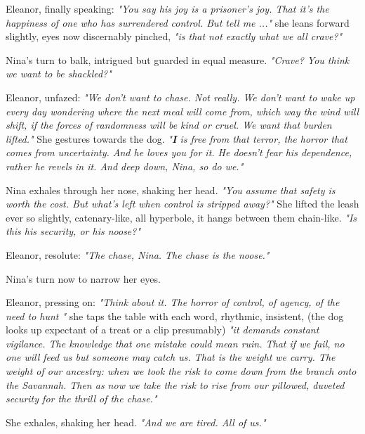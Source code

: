\smallskip

Eleanor, finally speaking: \textit{"You say his joy is a prisoner’s joy. That it’s the happiness of one who has surrendered control. But tell me ..."} she leans forward slightly, eyes now discernably pinched, \textit{"is that not exactly what we all crave?"}

\smallskip

Nina's turn to balk, intrigued but guarded in equal measure. \textit{"Crave? You think we want to be shackled?"}

\smallskip

Eleanor, unfazed: \textit{"We don’t want to chase. Not really. We don’t want to wake up every day wondering where the next meal will come from, which way the wind will shift, if the forces of randomness will be kind or cruel. We want that burden lifted."} She gestures towards the dog. \textit{"\textbf{I} is free from that terror, the horror that comes from uncertainty. And he loves you for it. He doesn’t fear his dependence, rather he revels in it. And deep down, Nina, so do we."}

\smallskip

Nina exhales through her nose, shaking her head. \textit{"You assume that safety is worth the cost. But what’s left when control is stripped away?"} She lifted the leash ever so slightly, catenary-like, all hyperbole, it hangs between them chain-like. \textit{"Is this his security, or his noose?"}

\smallskip

Eleanor, resolute: \textit{"The chase, Nina. The chase is the noose."}

\smallskip

Nina's turn now to narrow her eyes.  

\smallskip

Eleanor, pressing on: \textit{"Think about it. The horror of control, of agency, of the need to hunt "} she taps the table with each word, rhythmic, insistent, (the dog looks up expectant of a treat or a clip presumably) \textit{"it demands \textit{constant vigilance}. The knowledge that one mistake could mean ruin. That if we fail, no one will feed us but someone may catch us. That is the weight we carry. The weight of our ancestry: when we took the risk to come down from the branch onto the Savannah. Then as now we take the risk to rise from our pillowed, duveted security for the thrill of the chase."} 

She exhales, shaking her head. \textit{"And we are tired. All of us."}

